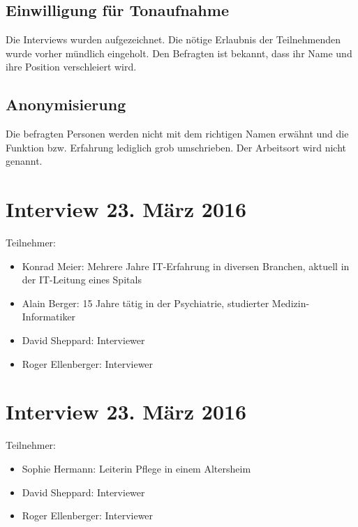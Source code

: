 \documentclass[a4paper]{scrartcl}
\begin{document}
\subsection{Einwilligung für Tonaufnahme}
Die Interviews wurden aufgezeichnet. Die nötige Erlaubnis der Teilnehmenden wurde vorher mündlich eingeholt. Den Befragten ist bekannt, dass ihr Name und ihre Position verschleiert wird.


\subsection{Anonymisierung}
Die befragten Personen werden nicht mit dem richtigen Namen erwähnt und die Funktion bzw. Erfahrung lediglich grob umschrieben. Der Arbeitsort wird nicht genannt.


\section{Interview 23. März 2016}
Teilnehmer:
\begin{itemize}
\item Konrad Meier: Mehrere Jahre IT-Erfahrung in diversen Branchen, aktuell in der IT-Leitung eines Spitals
\item Alain Berger: 15 Jahre tätig in der Psychiatrie, studierter Medizin-Informatiker
\item David Sheppard: Interviewer
\item Roger Ellenberger: Interviewer
\end{itemize}


\section{Interview 23. März 2016}
Teilnehmer:
\begin{itemize}
\item Sophie Hermann: Leiterin Pflege in einem Altersheim
\item David Sheppard: Interviewer
\item Roger Ellenberger: Interviewer
\end{itemize}
\end{document}
